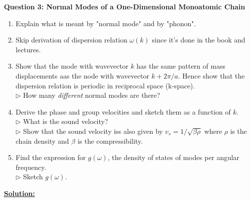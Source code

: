 \documentclass[11pt]{article}
\begin{document}
\begin{bluebox}
  \textbf{Question 3: Normal Modes of a One-Dimensional Monoatomic Chain}\\
  \begin{enumerate}[label=(\alph*)]
    \item Explain what is meant by "normal mode" and by "phonon".
    \item Skip derivation of dispersion relation $\omega(k)$ since it's done in the book and lectures.
    \item Show that the mode with wavevector $k$ has the same pattern of mass displacements aas the node with wavevector $k + 2\pi/a$. Hence show that the dispersion relation is periodic in reciprocal space (k-space).\\
    $\triangleright$ How many \textit{different} normal modes are there? 
    \item Derive the phase and group velocities and sketch them as a function of $k$.\\
    $\triangleright$ What is the sound velocity? \\
    $\triangleright$ Show that the sound velocity iss also given by $v_s = 1/\sqrt{\beta \rho}$ where $\rho$ is the chain density and $\beta$ is the compressibility.
    \item Find the expression for $g(\omega)$, the density of states of modes per angular frequency. \\
    $\triangleright$ Sketch $g(\omega)$.
  \end{enumerate} 
\end{bluebox}

\vskip 0.5cm
\textbf{\underline{Solution:}}
\end{document}
